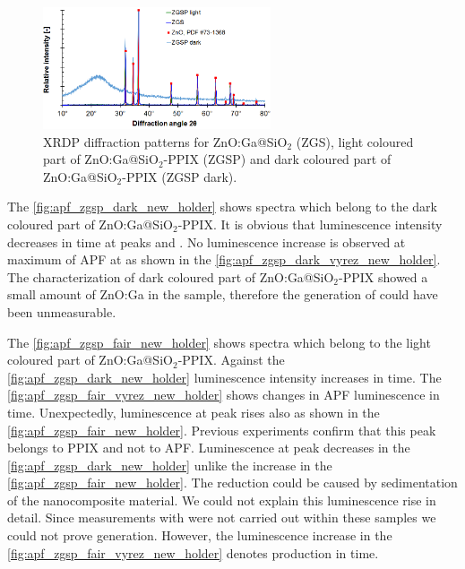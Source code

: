         \begin{figure}
        \centering
        \includegraphics[width=0.6\textwidth]{pictures/xrd_zgsp_dark_fair.PNG}
        \caption{XRDP diffraction patterns for ZnO:Ga@SiO$_{2}$ (ZGS), light coloured part of ZnO:Ga@SiO$_{2}$-PPIX (ZGSP) and dark coloured part of ZnO:Ga@SiO$_{2}$-PPIX (ZGSP dark).}
        \label{fig:xrd_zgsp_dark_fair}
        \end{figure}
    
    The \cref{fig:apf_zgsp_dark_new_holder} shows spectra which belong to the dark coloured part of ZnO:Ga@SiO$_{2}$-PPIX. It is obvious that luminescence intensity decreases in time at peaks  and . No luminescence increase is observed at maximum of APF at  as shown in the \cref{fig:apf_zgsp_dark_vyrez_new_holder}. The characterization of dark coloured part of ZnO:Ga@SiO$_{2}$-PPIX showed a small amount of ZnO:Ga in the sample, therefore the generation of {\singlet} could have been unmeasurable.

    The \cref{fig:apf_zgsp_fair_new_holder} shows spectra which belong to the light coloured part of ZnO:Ga@SiO$_{2}$-PPIX. Against the \cref{fig:apf_zgsp_dark_new_holder} luminescence intensity increases in time. The \cref{fig:apf_zgsp_fair_vyrez_new_holder} shows changes in APF luminescence in time. Unexpectedly, luminescence at peak  rises also as shown in the \cref{fig:apf_zgsp_fair_new_holder}. Previous experiments confirm that this peak belongs to PPIX and not to APF. Luminescence at peak  decreases  in the \cref{fig:apf_zgsp_dark_new_holder} unlike the increase in the \cref{fig:apf_zgsp_fair_new_holder}. The reduction could be caused by sedimentation of the nanocomposite material. We could not explain this luminescence rise in detail. Since measurements with {\azid} were not carried out within these samples we could not prove {\singlet} generation. However, the luminescence increase in the \cref{fig:apf_zgsp_fair_vyrez_new_holder} denotes {\singlet} production in time.

